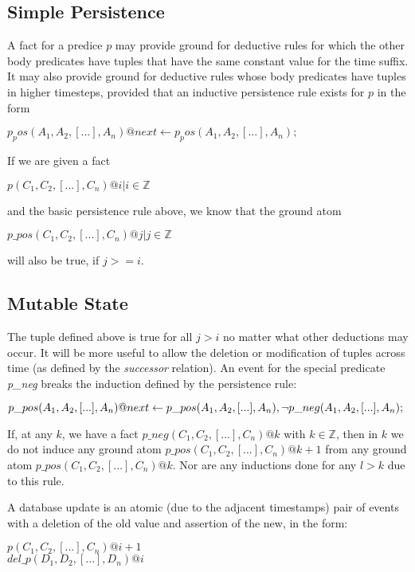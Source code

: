 \documentclass{acm_proc_article-sp-sigmod09}
\newcommand{\paa}[1]{{\textcolor{blue}{#1 -- paa}}}
\begin{document}
\subsection{Simple Persistence}

A fact for a predice $p$ may provide ground for deductive rules for which the other body predicates have 
tuples that have the same constant value for the time suffix.  It may also provide 
ground for deductive rules whose body predicates have tuples in higher timesteps, provided 
that an inductive persistence rule exists for $p$ in the form 

$p_pos(A_1,A_2,[...],A_n)@next \leftarrow 
p_pos(A_1,A_2,[...],A_n);$

If we are given a fact 

$p(C_1, C_2,[...],C_n)@i |   i \in \mathbb{Z}$


and the basic persistence rule above, we know that the ground atom

$p\_pos(C_1, C_2,[...],C_n)@j | j \in \mathbb{Z}$

will also be true, if $j >= i$.

\subsection{Mutable State}

The tuple defined above is true for all $j > i$ no matter what other deductions may occur.  It will be more useful
to allow the deletion or modification of tuples across time (as defined by the \emph{successor} relation).  An
event for the special predicate \emph{p\_neg} breaks the induction defined by the persistence rule:

$p\_pos(A_1,A_2,[...],A_n)@next \leftarrow \\
p\_pos(A_1,A_2,[...],A_n), \\
\lnot p\_neg(A_1,A_2,[...],A_n);
$

If, at any $k$, we have a fact $p\_neg(C_1,C_2,[...],C_n)@k$ with $k \in \mathbb{Z}$,  then in $k$
we do not induce any ground atom $p\_pos(C_1,C_2,[...],C_n)@k+1$ from any ground atom
$p\_pos(C_1,C_2,[...],C_n)@k$.  Nor are any inductions done for any $l > k$ due to this rule.

A database update is an atomic (due to the adjacent timestamps)
pair of events with a deletion of the old value and assertion of the new, in
the form:

$p(C_{1},C_{2},[...],C_{n})@i+1$
\\
$del\_p(D_{1},D_{2},[...],D_{n})@i$
\end{document}
